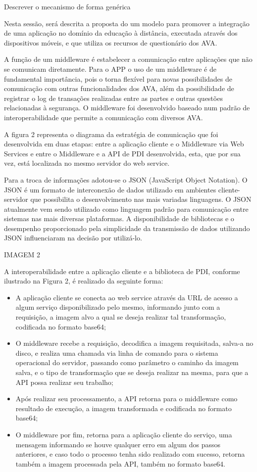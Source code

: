 \documentclass[12pt]{article}
\begin{document}
Descrever o mecanismo de forma genérica

Nesta sessão, será descrita a proposta do um modelo para promover a integração
de uma aplicação no domínio da educação à distância, executada através dos
dispositivos móveis, e que utiliza os recursos de questionário dos AVA.

A função de um middleware é estabelecer a comunicação entre aplicações que
não se comunicam diretamente. Para o APP o uso de um middleware é de fundamental
importância, pois o torna flexível para novas possibilidades de comunicação com outras
funcionalidades dos AVA, além da possibilidade de registrar o log de transações
realizadas entre as partes e outras questões relacionadas à segurança. O middleware foi 
desenvolvido baseado num padrão de interoperabilidade que permite a comunicação
com diversos AVA. 

A figura 2 representa o diagrama da estratégia de comunicação que
foi desenvolvida em duas etapas: entre a aplicação cliente e o Middleware via Web Services e entre
o Middleware e a API de PDI desenvolvida, esta, que por sua vez, está localizada no mesmo servidor do web service.

Para a troca de informações adotou-se o JSON (JavaScript Object Notation). O
JSON é um formato de interconexão de dados utilizado em ambientes cliente-servidor
que possibilita o desenvolvimento nas mais variadas linguagens. O JSON atualmente
vem sendo utilizado como linguagem padrão para comunicação entre sistemas nas mais
diversas plataformas. A disponibilidade de bibliotecas e o desempenho proporcionado
pela simplicidade da transmissão de dados utilizando JSON influenciaram na decisão
por utilizá-lo.


IMAGEM 2

A interoperabilidade entre a aplicação cliente e a biblioteca de PDI, conforme ilustrado na Figura 2, é
realizado da seguinte forma:
\begin{itemize}
	\item A aplicação cliente se conecta ao web service através da URL de acesso a algum serviço disponibilizado pelo mesmo, informando junto com a requisição, a imagem alvo a qual se deseja realizar tal transformação, codificada no formato base64;
	\item O middleware recebe a requisição, decodifica a imagem requisitada, salva-a no disco, e realiza uma chamada via linha de comando para o sistema operacional do servidor, passando como parâmetro o caminho da imagem salva, e o tipo de transformação que se deseja realizar na mesma, para que a API possa realizar seu trabalho;
	\item Após realizar seu processamento, a API retorna para o middleware como resultado de execução, a imagem transformada e codificada no formato base64;
	\item O middleware por fim, retorna para a aplicação cliente do serviço, uma mensagem informando se houve qualquer erro em algum dos passos anteriores, e caso todo o processo tenha sido realizado com sucesso, retorna também a imagem processada pela API, também no formato base64.
\end{itemize}
\end{document}
